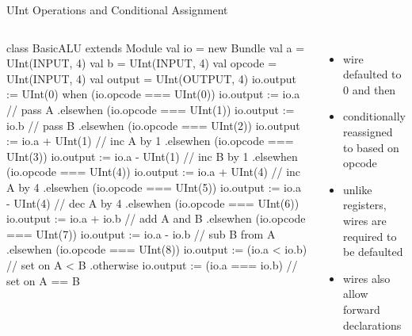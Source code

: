 \documentclass[xcolor=pdflatex,dvipsnames,table]{beamer}
\begin{document}
\begin{frame}[fragile]{UInt Operations and Conditional Assignment}

\begin{columns}

{
\begin{scala}
class BasicALU extends Module {
  val io = new Bundle {
    val a      = UInt(INPUT, 4)
    val b      = UInt(INPUT, 4)
    val opcode = UInt(INPUT, 4)
    val output = UInt(OUTPUT, 4)
  }
  io.output := UInt(0) 
  when (io.opcode === UInt(0)) {
    io.output := io.a                   // pass A
  } .elsewhen (io.opcode === UInt(1)) {
    io.output := io.b                   // pass B
  } .elsewhen (io.opcode === UInt(2)) {
    io.output := io.a + UInt(1)         // inc A by 1
  } .elsewhen (io.opcode === UInt(3)) {
    io.output := io.a - UInt(1)         // inc B by 1
  } .elsewhen (io.opcode === UInt(4)) {
    io.output := io.a + UInt(4)         // inc A by 4
  } .elsewhen (io.opcode === UInt(5)) {
    io.output := io.a - UInt(4)         // dec A by 4
  } .elsewhen (io.opcode === UInt(6)) {
    io.output := io.a + io.b            // add A and B
  } .elsewhen (io.opcode === UInt(7)) {
    io.output := io.a - io.b            // sub B from A
  } .elsewhen (io.opcode === UInt(8)) {
    io.output := (io.a < io.b)          // set on A < B
  } .otherwise { 
    io.output := (io.a === io.b)        // set on A == B
  }
}
\end{scala}
}

\begin{itemize}
\item wire  defaulted to 0 and then
\item conditionally reassigned to based on opcode
\item unlike registers, wires are required to be defaulted
\item wires also allow forward declarations
\end{itemize}
\end{columns}
\end{frame}
\end{document}
